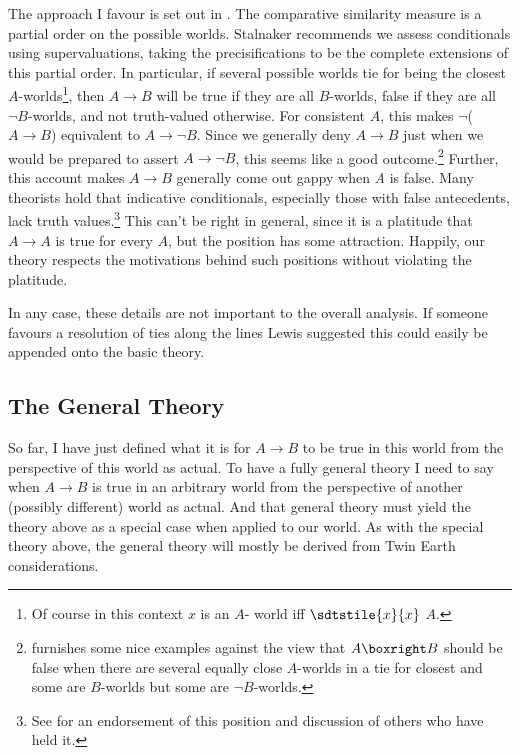 The approach I favour is set out in \citet{Stalnaker1981}. The comparative similarity measure is a partial order on the possible worlds. Stalnaker recommends we assess conditionals using supervaluations, taking the precisifications to be the complete extensions of this partial order. In particular, if several possible worlds tie for being the closest \(A\)\nobreakdash-worlds\footnote{Of course in this context \(x\) is an \(A\)\nobreakdash- world iff \(\sdtstile{x}{x}\) \(A\).}, then \(A \rightarrow B\) will be true if they are all \(B\)\nobreakdash-worlds, false if they are all \(\neg B\)\nobreakdash-worlds, and not truth-valued otherwise. For consistent \(A\), this makes \(\neg\)(\(A \rightarrow B\)) equivalent to \(A \rightarrow \neg B\). Since we generally deny \(A \rightarrow B\) just when we would be prepared to assert \(A \rightarrow \neg B\), this seems like a good outcome.\footnote{\citet{Edgington1996} furnishes some nice examples against the view that \(A \boxright B\) should be false when there are several equally close \(A\)\nobreakdash-worlds in a tie for closest and some are \(B\)\nobreakdash-worlds but some are \(\neg B\)\nobreakdash-worlds.} Further, this account makes \(A \rightarrow B\) generally come out gappy when \textit{A }is false. Many theorists hold that indicative conditionals, especially those with false antecedents, lack truth values.\footnote{See \citet{Edgington1995} for an endorsement of this position and discussion of others who have held it.} This can't be right in general, since it is a platitude that \(A \rightarrow A\) is true for every \(A\), but the position has some attraction. Happily, our theory respects the motivations behind such positions without violating the platitude.

In any case, these details are not important to the overall analysis. If someone favours a resolution of ties along the lines Lewis suggested this could easily be appended onto the basic theory.

\subsection{The General Theory}
So far, I have just defined what it is for \(A \rightarrow B\) to be true in this world from the perspective of this world as actual. To have a fully general theory I need to say when \(A \rightarrow B\) is true in an arbitrary world from the perspective of another (possibly different) world as actual. And that general theory must yield the theory above as a special case when applied to our world. As with the special theory above, the general theory will mostly be derived from Twin Earth considerations.

